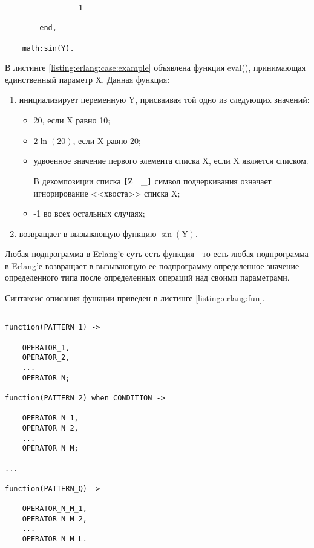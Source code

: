 \begin{itemize}
\begin{lstlisting}
				-1

		end,

	math:sin(Y).

\end{lstlisting}
\mylistingend

		В листинге \ref{listing:erlang:case:example} объявлена функция eval(), принимающая единственный параметр X. Данная функция:

		\begin{enumerate}

			\item инициализирует переменную Y, присваивая той одно из следующих значений:

			\begin{itemize}

				\item 20, если X равно 10;
				\item $2\ln(20)$, если X равно 20;
				\item удвоенное значение первого элемента списка X, если X является списком.

					В декомпозиции списка \verb|[|Z | \_\verb|]| символ подчеркивания означает игнорирование <<хвоста>> списка X;

				\item -1 во всех остальных случаях;

			\end{itemize}

			\item возвращает в вызывающую функцию $\sin(\text{Y})$.

		\end{enumerate}

\end{itemize}


Любая подпрограмма в Erlang'е суть есть функция - то есть любая подпрограмма в Erlang'е возвращает в вызывающую ее подпрограмму определенное значение определенного типа после определенных операций над своими параметрами.

Синтаксис описания функции приведен в листинге \ref{listing:erlang:fun}.

\begin{lstlisting}

function(PATTERN_1) ->

	OPERATOR_1,
	OPERATOR_2,
	...
	OPERATOR_N;

function(PATTERN_2) when CONDITION ->

	OPERATOR_N_1,
	OPERATOR_N_2,
	...
	OPERATOR_N_M;

...

function(PATTERN_Q) ->

	OPERATOR_N_M_1,
	OPERATOR_N_M_2,
	...
	OPERATOR_N_M_L.

\end{lstlisting}
\mylistingend

